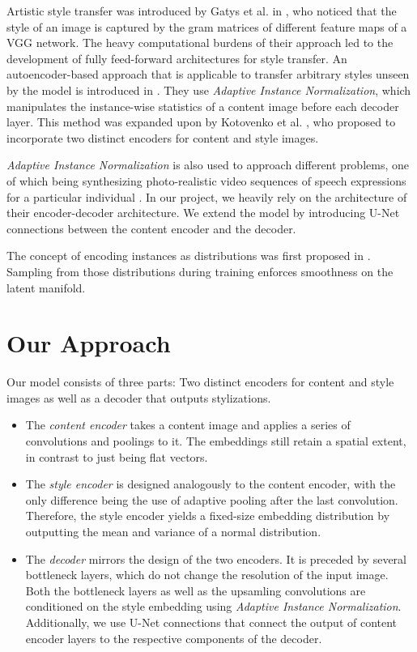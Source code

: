 \documentclass[10pt,twocolumn,letterpaper]{article}
\begin{document}
Artistic style transfer was introduced by Gatys et al. in \cite{gatys}, who noticed that the style of an image is captured by the gram matrices of different feature maps of a VGG network. The heavy computational burdens of their approach led to the development of fully feed-forward architectures for style transfer. An autoencoder-based approach that is applicable to transfer arbitrary styles unseen by the model is introduced in \cite{adain}. They use \textit{Adaptive Instance Normalization}, which manipulates the instance-wise statistics of a content image before each decoder layer. This method was expanded upon by Kotovenko et al. \cite{disentanglement}, who proposed to incorporate two distinct encoders for content and style images.

\textit{Adaptive Instance Normalization} is also used to approach different problems, one of which being synthesizing photo-realistic video sequences of speech expressions for a particular individual \cite{talkingheads}. In our project, we heavily rely on the architecture of their encoder-decoder architecture. We extend the model by introducing U-Net \cite{unet} connections between the content encoder and the decoder.

The concept of encoding instances as distributions was first proposed in \cite{vae}. Sampling from those distributions during training enforces smoothness on the latent manifold.


\section{Our Approach}

Our model consists of three parts: Two distinct encoders for content and style images as well as a decoder that outputs stylizations.
\begin{itemize}
	\item The \textit{content encoder} takes a content image and applies a series of convolutions and poolings to it. The embeddings still retain a spatial extent, in contrast to just being flat vectors.
	\item The \textit{style encoder} is designed analogously to the content encoder, with the only difference being the use of adaptive pooling after the last convolution. Therefore, the style encoder yields a fixed-size embedding distribution by outputting the mean and variance of a normal distribution.
	\item The \textit{decoder} mirrors the design of the two encoders. It is preceded by several bottleneck layers, which do not change the resolution of the input image. Both the bottleneck layers as well as the upsamling convolutions are conditioned on the style embedding using \textit{Adaptive Instance Normalization}. Additionally, we use U-Net connections that connect the output of content encoder layers to the respective components of the decoder.
\end{itemize}
	
\end{document}
